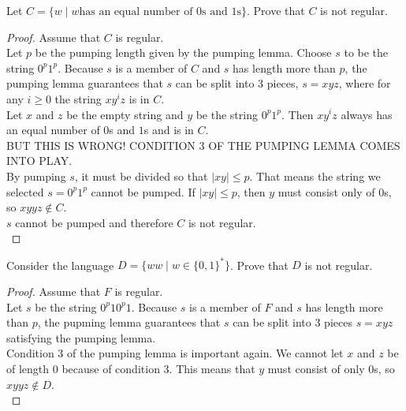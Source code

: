 \documentclass[11pt,a4paper]{article}
\begin{document}
\begin{example}
    Let $C=\{w\mid w\text{has an equal number of $0$s and $1$s}\}$. Prove that $C$ is not regular.

    \begin{proof}
        Assume that $C$ is regular. \\

        Let $p$ be the pumping length given by the pumping lemma. Choose $s$ to be the string $0^p1^p$.
        Because $s$ is a member of $C$ and $s$ has length more than $p$, the pumping lemma guarantees that $s$ can be split into 3 pieces, $s=xyz$, where for any $i\geq 0$ the string $xy^iz$ is in $C$. \\
        
        Let $x$ and $z$ be the empty string and $y$ be the string $0^p1^p$. Then $xy^iz$ always has an equal number of $0$s and $1$s and is in $C$. \\

        BUT THIS IS WRONG! CONDITION 3 OF THE PUMPING LEMMA COMES INTO PLAY. \\
        
        By pumping $s$, it must be divided so that $|xy|\leq p$. That means the string we selected $s=0^p1^p$ cannot be pumped.
        If $|xy|\leq p$, then $y$ must consist only of $0$s, so $xyyz\notin C$. \\

        $s$ cannot be pumped and therefore $C$ is not regular. \\
    \end{proof}
\end{example}

\begin{example}
    Consider the language $D=\{ww\mid w\in\{0,1\}^*\}$. Prove that $D$ is not regular.
    
    \begin{proof}
        Assume that $F$ is regular. \\

        Let $s$ be the string $0^p10^p1$. Because $s$ is a member of $F$ and $s$ has length more than $p$, the pupming lemma guarantees that $s$ can be split into 3 pieces $s=xyz$ satisfying the pumping lemma. \\

        Condition 3 of the pumping lemma is important again. We cannot let $x$ and $z$ be of length 0 because of condition 3.
        This means that $y$ must consist of only $0$s, so $xyyz\notin D$. \\
    \end{proof}
\end{example}
\end{document}
